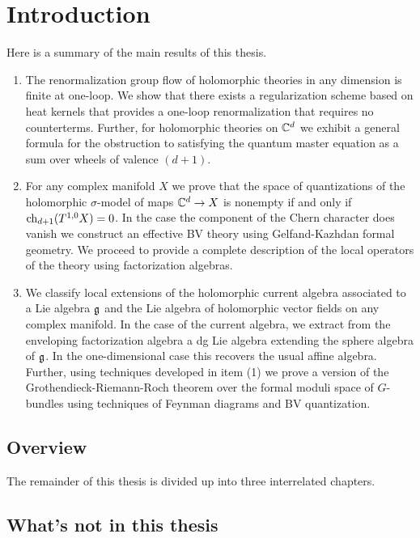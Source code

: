 
\chapter{Introduction}

Here is a summary of the main results of this thesis.

\begin{enumerate}
\item The renormalization group flow of holomorphic theories in any dimension is finite at one-loop.
We show that there exists a regularization scheme based on heat kernels that provides a one-loop renormalization that requires no counterterms. 
Further, for holomorphic theories on $\mathbb C^d$ we exhibit a general formula for the obstruction to satisfying the quantum master equation as a sum over wheels of valence $(d+1)$. 

\item For any complex manifold $X$ we prove that the space of quantizations of the holomorphic $\sigma$-model of maps $\mathbb C^d \to X$ is nonempty if and only if ${\rm ch}_{d+1}(T^{1,0}X) = 0$. 
In the case the component of the Chern character does vanish we construct an effective BV theory using Gelfand-Kazhdan formal geometry.
We proceed to provide a complete description of the local operators of the theory using factorization algebras.

\item We classify local extensions of the holomorphic current algebra associated to a Lie algebra $\mathfrak g$ and the Lie algebra of holomorphic vector fields on any complex manifold.
In the case of the current algebra, we extract from the enveloping factorization algebra a dg Lie algebra extending the sphere algebra of $\mathfrak g$.
In the one-dimensional case this recovers the usual affine algebra.
Further, using techniques developed in item (1) we prove a version of the Grothendieck-Riemann-Roch theorem over the formal moduli space of $G$-bundles using techniques of Feynman diagrams and BV quantization.

\end{enumerate}

\section{Overview}

The remainder of this thesis is divided up into three interrelated chapters. 


\section{What's not in this thesis}
